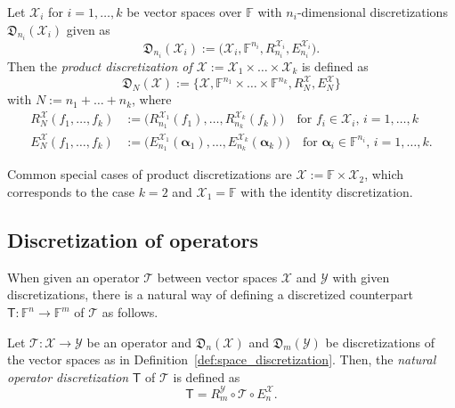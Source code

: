 \documentclass[a4paper]{paper}
\newcommand{\Discr}{\mathfrak{D}}
\newcommand{\VecSpace}[1]{\mathscr{#1}}
\newcommand{\Field}{\mathbb{F}}
\newcommand{\Op}[1]{\mathcal{#1}}
\newcommand{\DiscOp}[1]{\mathsf{#1}}
\newcommand*{\EXT}[2]{\ensuremath{E_{#1}^{#2}}}
\newcommand*{\REST}[2]{\ensuremath{R_{#1}^{#2}}}
\newcommand*{\RmY}{\ensuremath{\REST{m}{\VecSpace{Y}}}}
\newcommand*{\EnX}{\ensuremath{\EXT{n}{\VecSpace{X}}}}
\newcommand{\valpha}{\boldsymbol{\alpha}}
\begin{document}
\begin{definition}
 \label{def:product_space_discretization}
 Let $\VecSpace{X}_i$ for $i=1,\ldots,k$ be vector spaces over $\Field$ with $n_i$-dimensional discretizations 
 $\Discr_{n_i}(\VecSpace{X}_i)$ given as
 \begin{equation*}
  \Discr_{n_i}(\VecSpace{X}_i) := \bigl( \VecSpace{X}_i, \Field^{n_i}, \REST{n_i}{\VecSpace{X}_i}, \EXT{n_i}{\VecSpace{X}_i} \bigr). 
 \end{equation*}
 Then the \emph{product discretization of $\VecSpace{X} := \VecSpace{X}_1 \times \ldots \times \VecSpace{X}_k$} is defined as 
 \begin{equation*}
  \Discr_{N}(\VecSpace{X}):=\{\VecSpace{X}, \Field^{n_1} \times \ldots \times \Field^{n_k}, R_{N}^{\VecSpace{X}}, E_{N}^{\VecSpace{X}} \}
 \end{equation*}
 with $N := n_1 + \ldots + n_k$, where
 \begin{align*}
  \REST{N}{\VecSpace{X}}(f_1,\ldots,f_k) &:= \bigl( \REST{n_1}{\VecSpace{X}_1}(f_1),\ldots,\REST{n_k}{\VecSpace{X}_k}(f_k) \bigr)
   \quad\text{for $f_i\in \VecSpace{X}_i$, $i=1,\ldots,k$} \\
  \EXT{N}{\VecSpace{X}}(f_1,\ldots,f_k) &:= \bigl( \EXT{n_1}{\VecSpace{X}_1}(\valpha_1),\ldots,\EXT{n_k}{\VecSpace{X}_k}(\valpha_k) \bigr)
   \quad\text{for $\valpha_i\in \Field^{n_i}$, $i=1,\ldots,k$.}
 \end{align*}
\end{definition}

%
Common special cases of product discretizations are $\VecSpace{X}:=\Field \times \VecSpace{X}_2$, which corresponds to the case $k=2$ and 
$\VecSpace{X}_1=\Field$ with the identity discretization.


\subsection{Discretization of operators}

When given an operator $\Op{T}$ between vector spaces $\VecSpace{X}$ and $\VecSpace{Y}$ with given discretizations, there is a natural way 
of defining a discretized counterpart $\DiscOp{T}: \Field^n \to \Field^m$ of $\Op{T}$ as follows.

\begin{definition}
 \label{def:operator_discretization}
 Let $\Op{T}\colon \VecSpace{X} \to \VecSpace{Y}$ be an operator and $\Discr_n(\VecSpace{X})$ and $\Discr_m(\VecSpace{Y})$ be 
 discretizations of the vector spaces as in Definition~\ref{def:space_discretization}. Then, the \emph{natural operator discretization} 
$\DiscOp{T}$ of  $\Op{T}$ is defined as
 \begin{equation*}
  \DiscOp{T} = \RmY \circ \Op{T} \circ \EnX.
 \end{equation*}
\end{definition}
\end{document}
